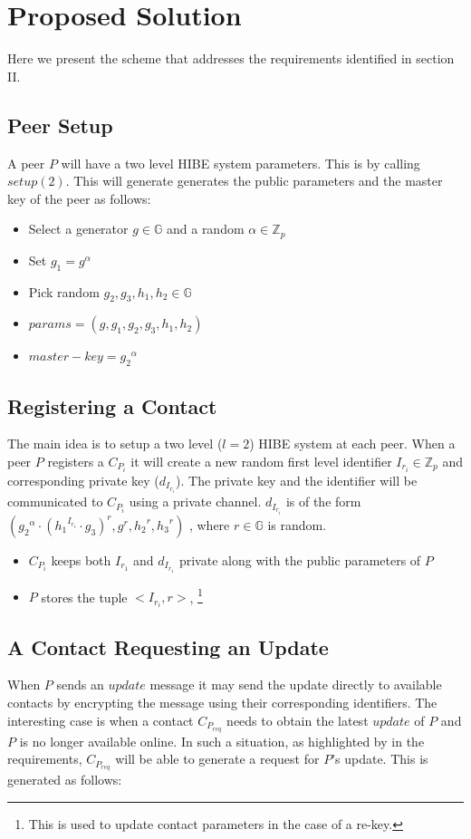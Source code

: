 \section{Proposed Solution}

Here we present the scheme that addresses the requirements identified in section II.

\subsection{Peer Setup}
A peer $P$ will have a two level HIBE system parameters. This is by calling $setup(2)$.
This will generate generates the public parameters and the master key of the peer as follows:
\begin{itemize}
	\item Select a generator $g \in \mathbb{G}$ and a random $\alpha \in \mathbb{Z}_p$
	\item Set $g_1 = g^{\alpha}$
	\item Pick random $g_2, g_3, h_1, h_2 \in \mathbb{G}$
	\item $params = (g, g_1, g_2, g_3, h_1, h_2)$
	\item $master-key = {g_2}^{\alpha}$
\end{itemize}


\subsection{Registering a Contact}

The main idea is to setup a two level ($l=2$) HIBE system at each peer. When a peer $P$ registers a $C_{P_i}$ it will create a new random first level identifier $I_{r_i} \in \mathbb{Z}_p$ and corresponding private key ($d_{I_{r_i}}$). The private key and the identifier will be communicated to $C_{P_i}$ using a private channel. $d_{I_{r_i}}$ is of the form
$({{g_2}^{\alpha}} \cdot {({{h_1}^{I_{r_i}}} \cdot {g_3} )}^r , g^r, {h_2}^r, {h_3}^r)$ ,
where $r \in \mathbb{G}$ is random.

\begin{itemize}
\item $C_{P_i}$ keeps both $I_{r_1}$ and $d_{I_{r_1}}$ private along with the public parameters of $P$
\item $P$ stores the tuple $<I_{r_i}, r>$, \footnote {This is used to update contact parameters in the case of a re-key.}
\end{itemize}


\subsection{A Contact Requesting an Update}
When $P$ sends an $update$ message it may send the update directly to available contacts by encrypting the message using their corresponding identifiers. The interesting case is when a contact $C_{P_{req}}$ needs to obtain the latest $update$ of $P$ and $P$ is no longer available online. In such a situation, as highlighted by in the requirements, $C_{P_{req}}$ will be able to generate a request for $P$'s update. This is generated as follows:


